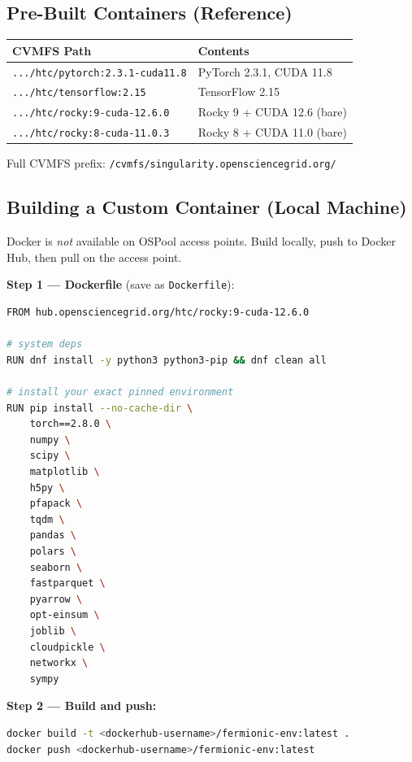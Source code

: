 \documentclass[11pt]{article}
\begin{document}
\subsection{Pre-Built Containers (Reference)}

\begin{center}
\begin{tabular}{ll}
\toprule
CVMFS Path & Contents \\
\midrule
\texttt{.../htc/pytorch:2.3.1-cuda11.8} & PyTorch 2.3.1, CUDA 11.8 \\
\texttt{.../htc/tensorflow:2.15}         & TensorFlow 2.15 \\
\texttt{.../htc/rocky:9-cuda-12.6.0}     & Rocky 9 + CUDA 12.6 (bare) \\
\texttt{.../htc/rocky:8-cuda-11.0.3}     & Rocky 8 + CUDA 11.0 (bare) \\
\bottomrule
\end{tabular}
\end{center}

Full CVMFS prefix: \texttt{/cvmfs/singularity.opensciencegrid.org/}

\subsection{Building a Custom Container (Local Machine)}

Docker is \emph{not} available on OSPool access points. Build locally, push
to Docker Hub, then pull on the access point.

\textbf{Step 1 --- Dockerfile} (save as \texttt{Dockerfile}):

\begin{lstlisting}[language=bash]
FROM hub.opensciencegrid.org/htc/rocky:9-cuda-12.6.0

# system deps
RUN dnf install -y python3 python3-pip && dnf clean all

# install your exact pinned environment
RUN pip install --no-cache-dir \
    torch==2.8.0 \
    numpy \
    scipy \
    matplotlib \
    h5py \
    pfapack \
    tqdm \
    pandas \
    polars \
    seaborn \
    fastparquet \
    pyarrow \
    opt-einsum \
    joblib \
    cloudpickle \
    networkx \
    sympy
\end{lstlisting}

\textbf{Step 2 --- Build and push:}

\begin{lstlisting}[language=bash]
docker build -t <dockerhub-username>/fermionic-env:latest .
docker push <dockerhub-username>/fermionic-env:latest
\end{lstlisting}
\end{document}
